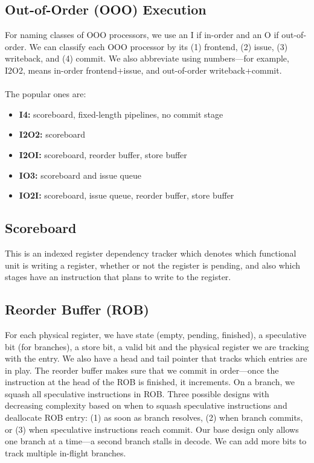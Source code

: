 \documentclass{article}
\begin{document}
\subsection{Out-of-Order (OOO) Execution}
For naming classes of OOO processors, we use an I if in-order and an O if out-of-order. We can classify each OOO processor by its (1) frontend, (2) issue, (3) writeback, and (4) commit. We also abbreviate using numbers---for example, I2O2, means in-order frontend+issue, and out-of-order writeback+commit. \\
\\
The popular ones are:
\begin{itemize}
\item \textbf{I4:} scoreboard, fixed-length pipelines, no commit stage
\item \textbf{I2O2:} scoreboard
\item \textbf{I2OI:} scoreboard, reorder buffer, store buffer
\item \textbf{IO3:} scoreboard and issue queue
\item \textbf{IO2I:} scoreboard, issue queue, reorder buffer, store buffer
\end{itemize}

\subsection{Scoreboard}
This is an indexed register dependency tracker which denotes which functional unit is writing a register, whether or not the register is pending, and also which stages have an instruction that plans to write to the register.

\subsection{Reorder Buffer (ROB)}
For each physical register, we have state (empty, pending, finished), a speculative bit (for branches), a store bit, a valid bit and the physical register we are tracking with the entry. We also have a head and tail pointer that tracks which entries are in play. The reorder buffer makes sure that we commit in order---once the instruction at the head of the ROB is finished, it increments. On a branch, we squash all speculative instructions in ROB. Three possible designs with decreasing complexity based on when to squash speculative instructions and deallocate ROB entry: (1) as soon as branch resolves, (2) when branch commits, or (3) when speculative instructions reach commit. Our base design only allows one branch at a time---a second branch stalls in decode. We can add more bits to track multiple in-flight branches. 
\end{document}
